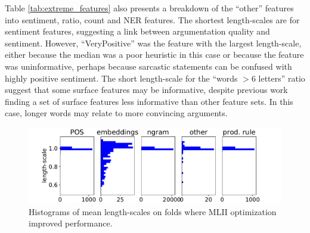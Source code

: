 Table \ref{tab:extreme_features} also presents a breakdown of the ``other'' features into sentiment, ratio, count and NER features. 
The shortest length-scales are for sentiment features, suggesting a link between 
argumentation quality and sentiment. However, ``VeryPositive'' was the feature with
the largest length-scale, either because the median was a poor heuristic in this case or
because the feature was uninformative, perhaps because sarcastic statements can be confused with highly positive sentiment.
The short length-scale for the ``words $>6$ letters'' ratio suggest that some surface features may be informative,
despite previous work \cite{wei2016post} finding a set of surface features less informative than other feature sets. 
In this case, longer words may relate to more convincing arguments.
\begin{figure}[h]
\includegraphics[width=\columnwidth, clip=True, trim=32 0 57 0]{figures/features2/boxplot}
\caption{Histograms of mean length-scales on folds where MLII optimization improved performance.}
\label{fig:boxplot}
\end{figure}
